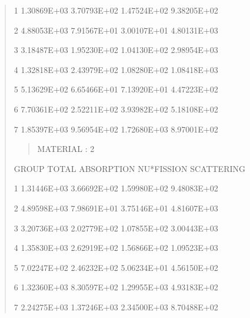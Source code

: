 \documentclass[letterpaper,10pt,english]{sphinxmanual}
\begin{document}
\begin{quote}
\begin{DUlineblock}{0em}
\item[] 1          1.30869E+03     3.70793E+02     1.47524E+02     9.38205E+02      \textbar{}
\item[] 2          4.88053E+03     7.91567E+01     3.00107E+01     4.80131E+03      \textbar{}
\item[] 3          3.18487E+03     1.95230E+02     1.04130E+02     2.98954E+03      \textbar{}
\item[] 4          1.32818E+03     2.43979E+02     1.08280E+02     1.08418E+03      \textbar{}
\item[] 5          5.13629E+02     6.65466E+01     7.13920E+01     4.47223E+02      \textbar{}
\item[] 6          7.70361E+02     2.52211E+02     3.93982E+02     5.18108E+02      \textbar{}
\item[] 7          1.85397E+03     9.56954E+02     1.72680E+03     8.97001E+02      \textbar{}
\end{DUlineblock}
\begin{quote}

MATERIAL :   2
\end{quote}

\begin{DUlineblock}{0em}
\item[] GROUP           TOTAL        ABSORPTION      NU*FISSION      SCATTERING        \textbar{}
\end{DUlineblock}

\begin{DUlineblock}{0em}
\item[] 1          1.31446E+03     3.66692E+02     1.59980E+02     9.48083E+02      \textbar{}
\item[] 2          4.89598E+03     7.98691E+01     3.75146E+01     4.81607E+03      \textbar{}
\item[] 3          3.20736E+03     2.02779E+02     1.07855E+02     3.00443E+03      \textbar{}
\item[] 4          1.35830E+03     2.62919E+02     1.56866E+02     1.09523E+03      \textbar{}
\item[] 5          7.02247E+02     2.46232E+02     5.06234E+01     4.56150E+02      \textbar{}
\item[] 6          1.32360E+03     8.30597E+02     1.29955E+03     4.93183E+02      \textbar{}
\item[] 7          2.24275E+03     1.37246E+03     2.34500E+03     8.70488E+02      \textbar{}
\end{DUlineblock}
\begin{quote}


\end{quote}
\end{quote}
\end{document}
